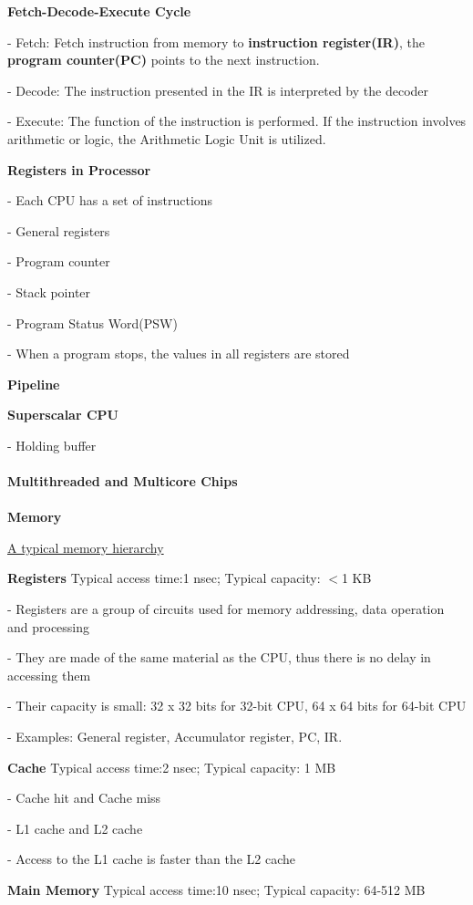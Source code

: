 \documentclass[]{report}
\begin{document}
\textbf{Fetch-Decode-Execute Cycle}

- Fetch: Fetch instruction from memory to \textbf{instruction register(IR)}, the \textbf{program counter(PC)} points to the next instruction.

- Decode: The instruction presented in the IR is interpreted by the decoder

- Execute: The function of the instruction is performed. If the instruction involves arithmetic or logic, the Arithmetic Logic Unit is utilized.

\textbf{Registers in Processor}

- Each CPU has a set of instructions

- General registers

- Program counter

- Stack pointer

- Program Status Word(PSW)

- When a program stops, the values in all registers are stored

\textbf{Pipeline}

\textbf{Superscalar CPU}

- Holding buffer\\\\
\textbf{Multithreaded and Multicore Chips}\\\\
\textbf{Memory}

\underline{A typical memory hierarchy}

\textbf{Registers} Typical access time:1 nsec; Typical capacity: $<$1 KB

- Registers are a group of circuits used for memory addressing, data operation and processing

- They are made of the same material as the CPU, thus there is no delay in accessing them

- Their capacity is small: 32 x 32 bits for 32-bit CPU, 64 x 64 bits for 64-bit CPU

- Examples: General register, Accumulator register, PC, IR.

\textbf{Cache} Typical access time:2 nsec; Typical capacity: 1 MB

- Cache hit and Cache miss

- L1 cache and L2 cache

- Access to the L1 cache is faster than the L2 cache

\textbf{Main Memory} Typical access time:10 nsec; Typical capacity: 64-512 MB
\end{document}
